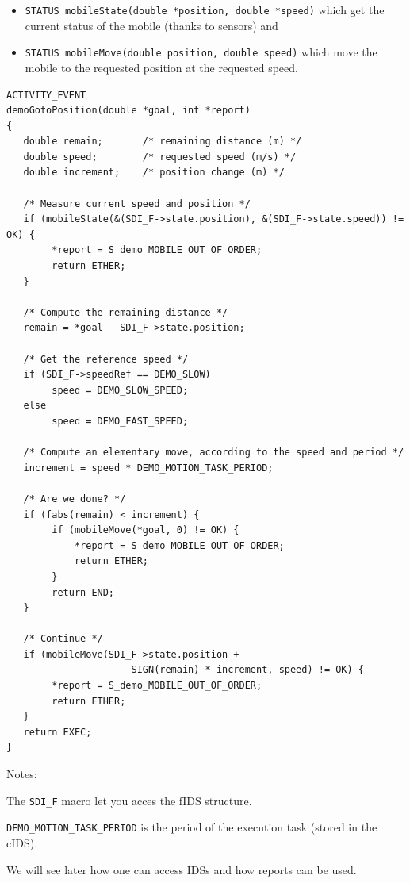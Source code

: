 \begin{itemize}
\item \texttt{STATUS mobileState(double *position, double *speed)} which get
the current status of the mobile (thanks to sensors) and
\item \texttt{STATUS mobileMove(double position, double speed)} which move
the mobile to the requested position at the requested speed.
\end{itemize}

\begin{center}\begin{cartouche}\small\begin{verbatim}
ACTIVITY_EVENT
demoGotoPosition(double *goal, int *report)
{
   double remain;       /* remaining distance (m) */
   double speed;        /* requested speed (m/s) */
   double increment;    /* position change (m) */

   /* Measure current speed and position */
   if (mobileState(&(SDI_F->state.position), &(SDI_F->state.speed)) != OK) {
        *report = S_demo_MOBILE_OUT_OF_ORDER;
        return ETHER;
   }

   /* Compute the remaining distance */
   remain = *goal - SDI_F->state.position;

   /* Get the reference speed */
   if (SDI_F->speedRef == DEMO_SLOW) 
        speed = DEMO_SLOW_SPEED;
   else
        speed = DEMO_FAST_SPEED;

   /* Compute an elementary move, according to the speed and period */
   increment = speed * DEMO_MOTION_TASK_PERIOD;

   /* Are we done? */
   if (fabs(remain) < increment) {
        if (mobileMove(*goal, 0) != OK) {
            *report = S_demo_MOBILE_OUT_OF_ORDER;
            return ETHER;
        }
        return END;
   }

   /* Continue */
   if (mobileMove(SDI_F->state.position +
                      SIGN(remain) * increment, speed) != OK) {
        *report = S_demo_MOBILE_OUT_OF_ORDER;
        return ETHER;
   }
   return EXEC;
}
\end{verbatim}\end{cartouche}\end{center}

Notes:

The \texttt{SDI\_F} macro let you acces the fIDS structure.

\texttt{DEMO\_MOTION\_TASK\_PERIOD} is the period of the execution task
(stored in the cIDS).

We will see later how one can access IDSs and how reports can be used.


